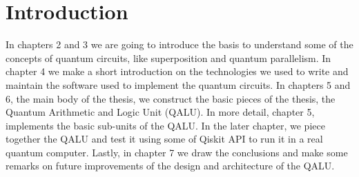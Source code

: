 \chapter{Introduction}

In chapters 2 and 3 we are going to introduce the basis to understand some of the concepts
of quantum circuits, like superposition and quantum parallelism. In chapter 4 we make a
short introduction on the technologies we used to write and maintain the software used
to implement the quantum circuits. In chapters 5 and 6, the main body of the thesis,
we construct the basic pieces of the thesis, the Quantum Arithmetic and Logic Unit (QALU). In
more detail, chapter 5, implements the basic sub-units of the QALU. In the later chapter,
we piece together the QALU and test it using some of Qiskit API to run it in a real
quantum computer. Lastly, in chapter 7 we draw the conclusions and make some remarks on
future improvements of the design and architecture of the QALU.